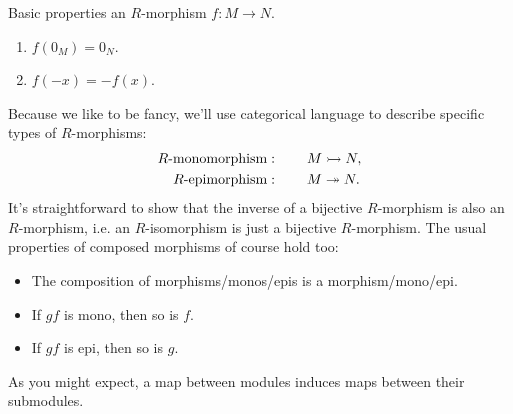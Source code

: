 \documentclass[twoside,10pt]{report}
\begin{document}
\begin{prop}
Basic properties an $R$-morphism $f:M\to N$.
\begin{enumerate}
	\item $f(0_{M})=0_{N}$.
	\item $f(-x)=-f(x)$.
\end{enumerate}
\end{prop}
Because we like to be fancy, we'll use categorical language to describe specific types of $R$-morphisms:
\begin{align*}
	R\text{-monomorphism}&: \quad\quad M \rightarrowtail N,\\
	R\text{-epimorphism}&: \quad\quad M \twoheadrightarrow N.
\end{align*}
It's straightforward to show that the inverse of a bijective $R$-morphism is also an $R$-morphism, i.e. an $R$-isomorphism is just a bijective $R$-morphism. The usual properties of composed morphisms of course hold too:
\begin{itemize}
	\item The composition of morphisms/monos/epis is a morphism/mono/epi.
	\item If $gf$ is mono, then so is $f$.
	\item If $gf$ is epi, then so is $g$.
\end{itemize}
As you might expect, a map between modules induces maps between their submodules.
\end{document}
